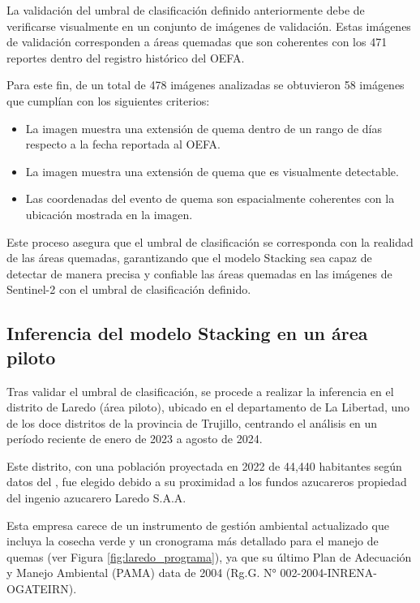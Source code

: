La validación del umbral de clasificación definido anteriormente debe de verificarse visualmente en un conjunto de imágenes de validación.
Estas imágenes de validación corresponden a áreas quemadas que son coherentes con los 471 reportes dentro del registro histórico del OEFA.

Para este fin, de un total de 478 imágenes analizadas se obtuvieron 58 imágenes que cumplían con los siguientes criterios:
\begin{itemize} 
    \item La imagen muestra una extensión de quema dentro de un rango de  días respecto a la fecha reportada al OEFA. 
    \item La imagen muestra una extensión de quema que es visualmente detectable. 
    \item Las coordenadas del evento de quema son espacialmente coherentes con la ubicación mostrada en la imagen. 
\end{itemize}

Este proceso asegura que el umbral de clasificación se corresponda con la realidad de las áreas quemadas, garantizando que el modelo Stacking sea capaz de detectar de manera precisa y confiable las áreas 
quemadas en las imágenes de Sentinel-2 con el umbral de clasificación definido.

\subsection{Inferencia del modelo Stacking en un área piloto}
\label{sec:inferencia}
Tras validar el umbral de clasificación, se procede a realizar la inferencia en el distrito de Laredo (área piloto), ubicado en el departamento de La Libertad, uno de los doce distritos de la provincia de Trujillo, centrando el análisis en un período reciente 
de enero de 2023 a agosto de 2024. 

Este distrito, con una población proyectada en 2022 de 44,440 habitantes según datos del 
\citet{inei_peru_2022}, fue elegido debido a su proximidad a los fundos azucareros propiedad del ingenio azucarero Laredo S.A.A. 

Esta empresa carece de un instrumento de gestión ambiental actualizado que incluya la cosecha verde y un cronograma más detallado 
para el manejo de quemas (ver Figura \ref{fig:laredo_programa}), ya que su último Plan de Adecuación y Manejo Ambiental (PAMA) data de 2004 (Rg.G. N° 002-2004-INRENA-OGATEIRN).

